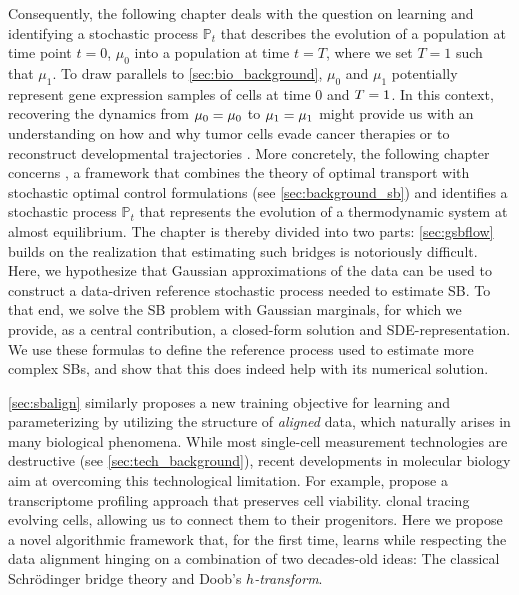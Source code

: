 Consequently, the following chapter deals with the question on learning and identifying a stochastic process $\mathbb{P}_t$ that describes the evolution of a population at time point $t=0$, $\mu_0$ into a population at time $t=T$, where we set $T=1$ such that $\mu_1$.
To draw parallels to \cref{sec:bio_background}, $\mu_0$ and $\mu_1$ potentially represent gene expression samples of cells at time $0$ and $T=1$. In this context, recovering the dynamics from $\mu_0 = \mu_0$ to $\mu_1 = \mu_1$ might provide us with an understanding on how and why tumor cells evade cancer therapies \citep{frangieh2021multimodal} or to reconstruct developmental trajectories \citep{schiebinger2019optimal}.
More concretely, the following chapter concerns , a framework that combines the theory of optimal transport with stochastic optimal control formulations (see \cref{sec:background_sb}) and identifies a stochastic process $\mathbb{P}_t$ that represents the evolution of a thermodynamic system at almost equilibrium. 
The chapter is thereby divided into two parts: 
\cref{sec:gsbflow} builds on the realization that estimating such bridges is notoriously difficult. Here, we hypothesize that Gaussian approximations of the data can be used to construct a data-driven reference stochastic process needed to estimate SB. To that end, we solve the \acrshort{SB} problem with Gaussian marginals, for which we provide, as a central contribution, a closed-form solution and SDE-representation. We use these formulas to define the reference process used to estimate more complex SBs, and show that this does indeed help with its numerical solution.

\cref{sec:sbalign} similarly proposes a new training objective for learning and parameterizing  by utilizing the structure of \emph{aligned} data, which naturally arises in many biological phenomena.
While most single-cell measurement technologies are destructive (see \cref{sec:tech_background}), recent developments in molecular biology aim at overcoming this technological limitation. For example, \citet{chen2022live} propose a transcriptome profiling approach that preserves cell viability. \citet{weinreb2020lineage} clonal tracing evolving cells, allowing us to connect them to their progenitors.
Here we propose a novel algorithmic framework that, for the first time, learns  while respecting the data alignment hinging on a combination of two decades-old ideas: The classical Schr{\"o}dinger bridge theory and Doob's \emph{$h$-transform}.

